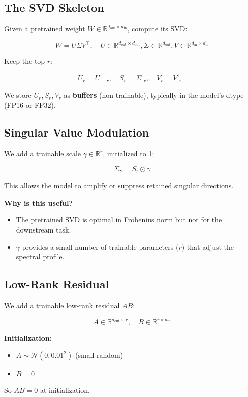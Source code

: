 \subsection{The SVD Skeleton}

Given a pretrained weight $W \in \mathbb{R}^{d_\text{out} \times d_\text{in}}$, 
compute its SVD:

\[
W = U \Sigma V^\top, \quad U \in \mathbb{R}^{d_\text{out} \times d_\text{out}}, 
\Sigma \in \mathbb{R}^{d_\text{out}}, V \in \mathbb{R}^{d_\text{in} \times d_\text{in}}
\tag{4.1}
\]

Keep the top-$r$:

\[
U_r = U_{:, :r}, \quad S_r = \Sigma_{:r}, \quad V_r = V_{:r, :}^\top
\tag{4.2}
\]

We store $U_r, S_r, V_r$ as \textbf{buffers} (non-trainable), typically in the 
model's dtype (FP16 or FP32).

\subsection{Singular Value Modulation}

We add a trainable scale $\gamma \in \mathbb{R}^r$, initialized to 1:

\[
\Sigma_\gamma = S_r \odot \gamma
\tag{4.3}
\]

This allows the model to amplify or suppress retained singular directions.

\textbf{Why is this useful?}
\begin{itemize}
\item The pretrained SVD is optimal in Frobenius norm but not for the downstream
  task.
\item $\gamma$ provides a small number of trainable parameters ($r$) that adjust
  the spectral profile.

\end{itemize}
\subsection{Low-Rank Residual}

We add a trainable low-rank residual $AB$:

\[
A \in \mathbb{R}^{d_\text{out} \times r}, \quad 
B \in \mathbb{R}^{r \times d_\text{in}}
\tag{4.4}
\]

\textbf{Initialization:}
\begin{itemize}
\item $A \sim \mathcal{N}(0, 0.01^2)$ (small random)
\item $B = 0$

\end{itemize}
So $AB = 0$ at initialization.

